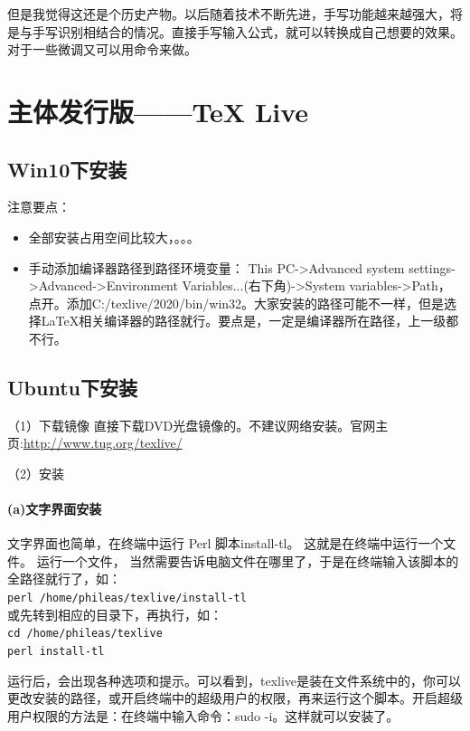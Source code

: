 但是我觉得这还是个历史产物。以后随着技术不断先进，手写功能越来越强大，将是与手写识别相结合的情况。直接手写输入公式，就可以转换成自己想要的效果。对于一些微调又可以用命令来做。




\section{主体发行版——\TeX{} Live }
\subsection{Win10下安装}
注意要点：
\begin{itemize}
\item 全部安装占用空间比较大，。。。
\item 手动添加编译器路径到路径环境变量：
This PC->Advanced system settings->Advanced->Environment Variables...(右下角)->System variables->Path，点开。添加C:/texlive/2020/bin/win32。大家安装的路径可能不一样，但是选择\LaTeX{}相关编译器的路径就行。要点是，一定是编译器所在路径，上一级都不行。
\end{itemize}



\subsection{Ubuntu下安装}
（1）下载镜像
直接下载DVD光盘镜像的。不建议网络安装。官网主页:\url{http://www.tug.org/texlive/}


（2）安装
\paragraph{(a)文字界面安装}
文字界面也简单，在终端中运行 Perl 脚本install-tl。 这就是在终端中运行一个文件。 运行一个文件， 当然需要告诉电脑文件在哪里了，于是在终端输入该脚本的全路径就行了，如：\\
\verb*|perl /home/phileas/texlive/install-tl|\\
或先转到相应的目录下，再执行，如：\\
\verb*|cd /home/phileas/texlive|\\
\verb*|perl install-tl|

运行后，会出现各种选项和提示。可以看到，texlive是装在文件系统中的，你可以更改安装的路径，或开启终端中的超级用户的权限，再来运行这个脚本。开启超级用户权限的方法是：在终端中输入命令：sudo -i。这样就可以安装了。


